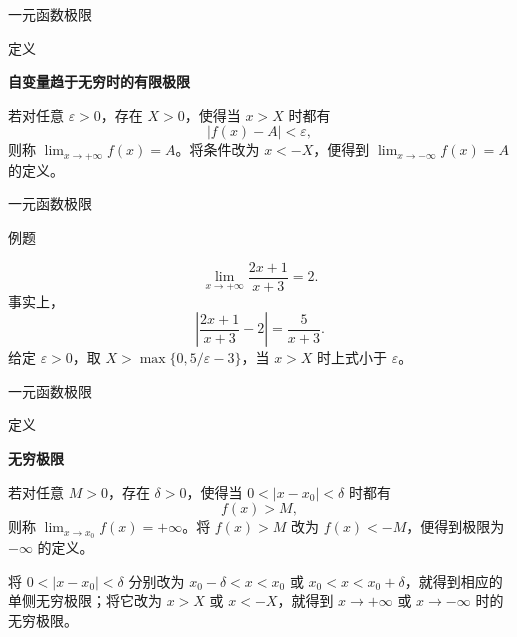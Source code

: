 \documentclass[aspectratio=169,10pt,fontset=fandol]{ctexbeamer}
\newenvironment{warning}{\par\noindent\textbf{注：}\quad}{\par\vspace{0.8em}}
\begin{document}
\begin{frame}[t,fragile]{一元函数极限}
\footnotesize
\begin{block}{定义}
{\footnotesize
\textbf{自变量趋于无穷时的有限极限}\par

若对任意 \(\varepsilon>0\)，存在 \(X>0\)，使得当 \(x>X\) 时都有
\[
|f(x)-A|<\varepsilon,
\]
则称 \(\lim_{x\to+\infty}f(x)=A\)。将条件改为 \(x<-X\)，便得到 \(\lim_{x\to-\infty}f(x)=A\) 的定义。

}
\end{block}
\end{frame}
\begin{frame}[t,fragile]{一元函数极限}
\footnotesize
\begin{block}{例题}
{\footnotesize
\[
\lim_{x\to+\infty}\frac{2x+1}{x+3}=2.
\]
事实上，
\[
\left|\frac{2x+1}{x+3}-2\right|=\frac5{x+3}.
\]
给定 \(\varepsilon>0\)，取 \(X>\max\{0,5/\varepsilon-3\}\)，当 \(x>X\) 时上式小于 \(\varepsilon\)。

}
\end{block}
\end{frame}
\begin{frame}[t,fragile]{一元函数极限}
\footnotesize
\begin{block}{定义}
{\footnotesize
\textbf{无穷极限}\par

若对任意 \(M>0\)，存在 \(\delta>0\)，使得当 \(0<|x-x_0|<\delta\) 时都有
\[
f(x)>M,
\]
则称 \(\lim_{x\to x_0}f(x)=+\infty\)。将 \(f(x)>M\) 改为 \(f(x)<-M\)，便得到极限为 \(-\infty\) 的定义。

将 \(0<|x-x_0|<\delta\) 分别改为 \(x_0-\delta<x<x_0\) 或 \(x_0<x<x_0+\delta\)，就得到相应的单侧无穷极限；将它改为 \(x>X\) 或 \(x<-X\)，就得到 \(x\to+\infty\) 或 \(x\to-\infty\) 时的无穷极限。

}
\end{block}
\end{frame}
\end{document}
